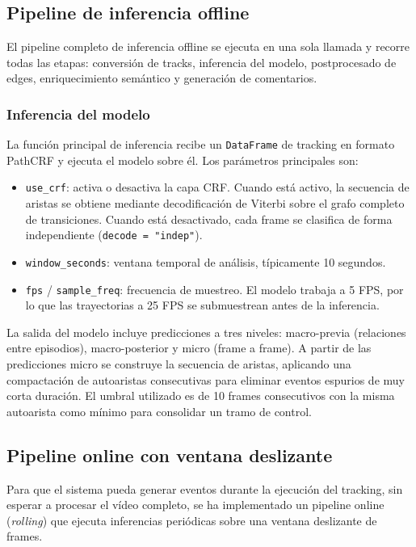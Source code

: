 \subsection{Pipeline de inferencia offline}
El pipeline completo de inferencia offline se ejecuta en una sola llamada y recorre todas las etapas: conversión de tracks, inferencia del modelo, postprocesado de edges, enriquecimiento semántico y generación de comentarios.
\subsubsection{Inferencia del modelo}
La función principal de inferencia recibe un \texttt{DataFrame} de tracking en formato PathCRF y ejecuta el modelo sobre él. Los parámetros principales son:
\begin{itemize}
    \item \texttt{use\_crf}: activa o desactiva la capa CRF. Cuando está activo, la secuencia de aristas se obtiene mediante decodificación de Viterbi sobre el grafo completo de transiciones. Cuando está desactivado, cada frame se clasifica de forma independiente (\texttt{decode = "indep"}).
    \item \texttt{window\_seconds}: ventana temporal de análisis, típicamente 10 segundos.
    \item \texttt{fps} / \texttt{sample\_freq}: frecuencia de muestreo. El modelo trabaja a 5 FPS, por lo que las trayectorias a 25 FPS se submuestrean antes de la inferencia.
\end{itemize}
La salida del modelo incluye predicciones a tres niveles: macro-previa (relaciones entre episodios), macro-posterior y micro (frame a frame). A partir de las predicciones micro se construye la secuencia de aristas, aplicando una compactación de autoaristas consecutivas para eliminar eventos espurios de muy corta duración. El umbral utilizado es de 10 frames consecutivos con la misma autoarista como mínimo para consolidar un tramo de control.

\subsection{Pipeline online con ventana deslizante}
Para que el sistema pueda generar eventos durante la ejecución del tracking, sin esperar a procesar el vídeo completo, se ha implementado un pipeline online (\textit{rolling}) que ejecuta inferencias periódicas sobre una ventana deslizante de frames.
